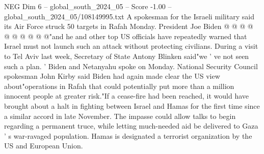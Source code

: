 \begin{textsample}{NEG Dim 6 – global\_south\_2024\_05 – Score -1.00 – global\_south\_2024\_05/108149995.txt}
A spokesman for the Israeli military said its Air Force struck 50 targets in Rafah Monday.
President Joe Biden @ @ @ @ @ @ @ @ @ @"and he and other top US officials have repeatedly warned that Israel must not launch such an attack without protecting civilians.
During a visit to Tel Aviv last week, Secretary of State Antony Blinken said"we ' ve not seen such a plan. ' Biden and Netanyahu spoke on Monday.
National Security Council spokesman John Kirby said Biden had again made clear the US view about"operations in Rafah that could potentially put more than a million innocent people at greater risk."If a cease-fire had been reached, it would have brought about a halt in fighting between Israel and Hamas for the first time since a similar accord in late November.
The impasse could allow talks to begin regarding a permanent truce, while letting much-needed aid be delivered to Gaza ' s war-ravaged population.
Hamas is designated a terrorist organization by the US and European Union.

\end{textsample}
